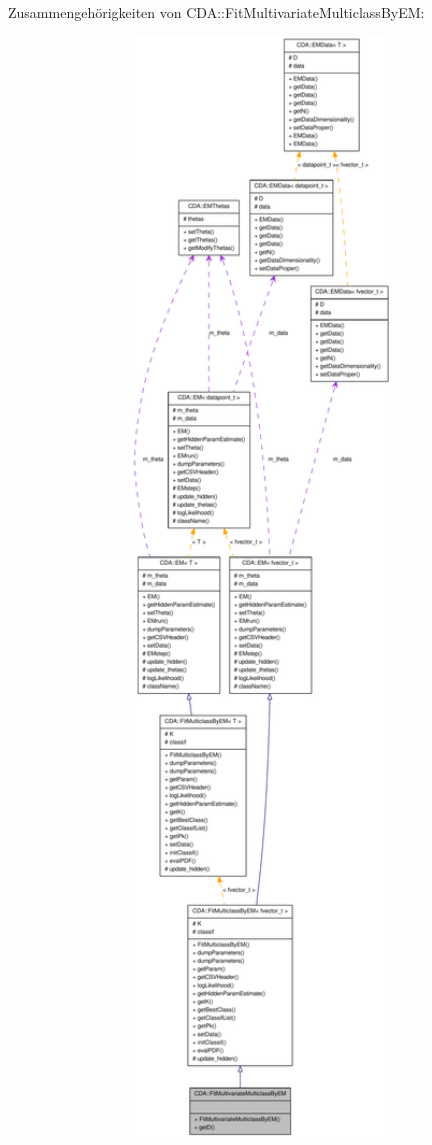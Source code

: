 Zusammengehörigkeiten von CDA::FitMultivariateMulticlassByEM:\nopagebreak
\begin{figure}[H]
\begin{center}
\leavevmode
\includegraphics[width=400pt]{classCDA_1_1FitMultivariateMulticlassByEM__coll__graph}
\end{center}
\end{figure}
